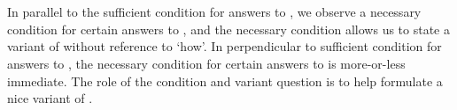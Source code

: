 \section{\qHowV{}}
\label{cha:var:qhowv}


\begin{note}
  In parallel to the sufficient condition for answers to \qWhy{}, we observe a necessary condition for certain answers to \qHow{}, and the necessary condition allows us to state a variant of \qHow{} without reference to `how'.
  In perpendicular to sufficient condition for answers to \qWhy{}, the necessary condition for certain answers to \qHow{} is more-or-less immediate.
  The role of the condition and variant question is to help formulate a nice variant of \issueInclusion{}.
\end{note}




